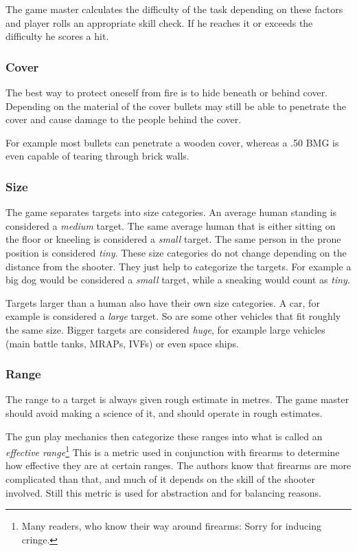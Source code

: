 The game master calculates the difficulty of the task depending on these factors
and player rolls an appropriate skill check. If he reaches it or exceeds the
difficulty he scores a hit.

\subsubsection{Cover}

The best way to protect oneself from fire is to hide beneath or behind cover.
Depending on the material of the cover bullets may still be able to penetrate
the cover and cause damage to the people behind the cover.

For example most bullets can penetrate a wooden cover, whereas a .50 BMG is even
capable of tearing through brick walls.

\subsubsection{Size}

The game separates targets into size categories. An average human standing is
considered a \emph{medium} target. The same average human that is either sitting
on the floor or kneeling is considered a \emph{small} target. The same person
in the prone position is considered \emph{tiny}. These size categories do not
change depending on the distance from the shooter. They just help to categorize
the targets. For example a big dog would be considered a \emph{small} target,
while a sneaking would count as \emph{tiny}.

Targets larger than a human also have their own size categories. A car, for
example is considered a \emph{large} target. So are some other vehicles that
fit roughly the same size. Bigger targets are considered \emph{huge}, for
example large vehicles (main battle tanks, MRAPs, IVFs) or even space ships.

\subsubsection{Range}

The range to a target is always given rough estimate in metres. The game master
should avoid making a science of it, and should operate in rough estimates.

The gun play mechanics then categorize these ranges into what is called an
\emph{effective range}\footnote{Many readers, who know their way around
  firearms: Sorry for inducing cringe.} This is a metric used in conjunction
with firearms to determine how effective they are at certain ranges. The authors
know that firearms are more complicated than that, and much of it depends on the
skill of the shooter involved. Still this metric is used for abstraction and for
balancing reasons.

